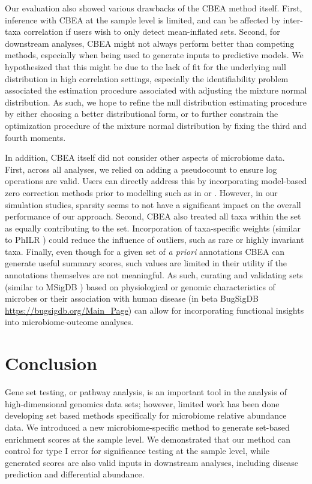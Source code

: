 \documentclass[10pt,letterpaper]{article}
\begin{document}
Our evaluation also showed various drawbacks of the CBEA method itself. First, inference with CBEA at the sample level is limited, and can be affected by inter-taxa correlation if users wish to only detect mean-inflated sets. Second, for downstream analyses, CBEA might not always perform better than competing methods, especially when being used to generate inputs to predictive models. We hypothesized that this might be due to the lack of fit for the underlying null distribution in high correlation settings, especially the identifiability problem associated the estimation procedure associated with adjusting the mixture normal distribution. As such, we hope to refine the null distribution estimating procedure by either choosing a better distributional form, or to further constrain the optimization procedure of the mixture normal distribution by fixing the third and fourth moments. 

In addition, CBEA itself did not consider other aspects of microbiome data. First, across all analyses, we relied on adding a pseudocount to ensure log operations are valid. Users can directly address this by incorporating model-based zero correction methods prior to modelling such as in \cite{martin-fernandez2012} or \cite{kaul2017a}. However, in our simulation studies, sparsity seems to not have a significant impact on the overall performance of our approach. Second, CBEA also treated all taxa within the set as equally contributing to the set. Incorporation of taxa-specific weights (similar to PhILR \cite{silverman2017}) could reduce the influence of outliers, such as rare or highly invariant taxa. Finally, even though for a given set of \emph{a priori} annotations CBEA can generate useful summary scores, such values are limited in their utility if the annotations themselves are not meaningful. As such, curating and validating sets (similar to MSigDB \cite{subramanian2005}) based on physiological or genomic characteristics of microbes \cite{weissman2021} or their association with human disease (in beta BugSigDB \url{https://bugsigdb.org/Main_Page}) can allow for incorporating functional insights into microbiome-outcome analyses.  

\section*{Conclusion}
Gene set testing, or pathway analysis, is an important tool in the analysis of high-dimensional genomics data sets; however, limited work has been done developing set based methods specifically for microbiome relative abundance data. We introduced a new microbiome-specific method to generate set-based enrichment scores at the sample level. We demonstrated that our method can control for type I error for significance testing at the sample level, while generated scores are also valid inputs in downstream analyses, including disease prediction and differential abundance.  
\end{document}
